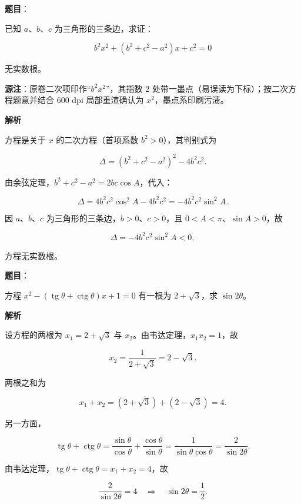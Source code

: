 \begin{answer}

\textbf{题目}：

已知 $a$、$b$、$c$ 为三角形的三条边，求证：

\nopagebreak[4]
\[
b^2x^2+(b^2+c^2-a^2)x+c^2=0
\]

无实数根。

\begin{gktip}
\textbf{源注}：原卷二次项印作“$b^2x^2$”，其指数 2 处带一墨点（易误读为下标）；按二次方程题意并结合 600 dpi 局部重渲确认为 $x^2$，墨点系印刷污渍。
\end{gktip}

\textbf{解析}

方程是关于 $x$ 的二次方程（首项系数 $b^2>0$），其判别式为

\nopagebreak[4]
\[
\Delta=(b^2+c^2-a^2)^2-4b^2c^2.
\]

由余弦定理，$b^2+c^2-a^2=2bc\cos A$，代入：

\nopagebreak[4]
\[
\Delta=4b^2c^2\cos^2A-4b^2c^2
=-4b^2c^2\sin^2A.
\]

因 $a$、$b$、$c$ 为三角形的三条边，$b>0$、$c>0$，且 $0<A<\pi$、$\sin A>0$，故

\nopagebreak[4]
\[
\Delta=-4b^2c^2\sin^2A<0,
\]

方程无实数根。


\end{answer}
\begin{answer}

\textbf{题目}：

方程 $x^2-(\operatorname{tg}\theta+\operatorname{ctg}\theta)x+1=0$ 有一根为 $2+\sqrt3$，求 $\sin2\theta$。

\textbf{解析}

设方程的两根为 $x_1=2+\sqrt3$ 与 $x_2$。由韦达定理，$x_1x_2=1$，故

\nopagebreak[4]
\[
x_2=\frac{1}{2+\sqrt3}=2-\sqrt3.
\]

两根之和为

\nopagebreak[4]
\[
x_1+x_2=(2+\sqrt3)+(2-\sqrt3)=4.
\]

另一方面，

\nopagebreak[4]
\[
\operatorname{tg}\theta+\operatorname{ctg}\theta
=\frac{\sin\theta}{\cos\theta}+\frac{\cos\theta}{\sin\theta}
=\frac{1}{\sin\theta\cos\theta}
=\frac{2}{\sin2\theta}.
\]

由韦达定理，$\operatorname{tg}\theta+\operatorname{ctg}\theta=x_1+x_2=4$，故

\nopagebreak[4]
\[
\frac{2}{\sin2\theta}=4
\quad\Longrightarrow\quad
\sin2\theta=\frac12.
\]


\end{answer}
